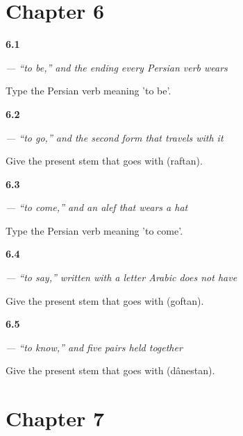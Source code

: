 \section*{Chapter 6}

\noindent\begin{minipage}[t]{\linewidth}
\raggedright
\hypertarget{review-FA-C06-budan-infinitive}{\textbf{6.1}} \emph{ — “to be,” and the ending every Persian verb wears}\par
\small Type the Persian verb meaning 'to be'.
\end{minipage}\par\medskip

\noindent\begin{minipage}[t]{\linewidth}
\raggedright
\hypertarget{review-FA-C06-raftan-stem}{\textbf{6.2}} \emph{ — “to go,” and the second form that travels with it}\par
\small Give the present stem that goes with  (raftan).
\end{minipage}\par\medskip

\noindent\begin{minipage}[t]{\linewidth}
\raggedright
\hypertarget{review-FA-C06-amadan-verb}{\textbf{6.3}} \emph{ — “to come,” and an alef that wears a hat}\par
\small Type the Persian verb meaning 'to come'.
\end{minipage}\par\medskip

\noindent\begin{minipage}[t]{\linewidth}
\raggedright
\hypertarget{review-FA-C06-goftan-stem}{\textbf{6.4}} \emph{ — “to say,” written with a letter Arabic does not have}\par
\small Give the present stem that goes with  (goftan).
\end{minipage}\par\medskip

\noindent\begin{minipage}[t]{\linewidth}
\raggedright
\hypertarget{review-FA-C06-danestan-pair}{\textbf{6.5}} \emph{ — “to know,” and five pairs held together}\par
\small Give the present stem that goes with  (dânestan).
\end{minipage}\par\medskip

\section*{Chapter 7}

